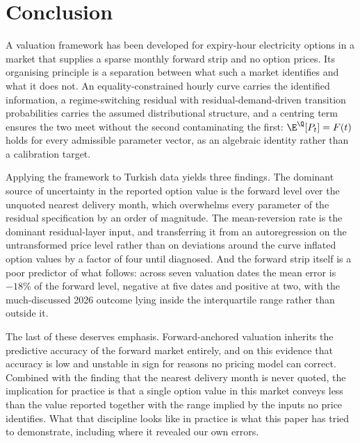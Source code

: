 \section{Conclusion}
\label{sec:conclusion}

A valuation framework has been developed for expiry-hour electricity options in a
market that supplies a sparse monthly forward strip and no option prices. Its
organising principle is a separation between what such a market identifies and
what it does not. An equality-constrained hourly curve carries the identified
information, a regime-switching residual with residual-demand-driven transition
probabilities carries the assumed distributional structure, and a centring term
ensures the two meet without the second contaminating the first:
$\E^{\Q}[P_t]=F(t)$ holds for every admissible parameter vector, as an algebraic
identity rather than a calibration target.

Applying the framework to Turkish data yields three findings. The dominant source
of uncertainty in the reported option value is the forward level over the
unquoted nearest delivery month, which overwhelms every parameter of the residual
specification by an order of magnitude. The mean-reversion rate is the dominant
residual-layer input, and transferring it from an autoregression on the
untransformed price level rather than on deviations around the curve inflated
option values by a factor of four until diagnosed. And the forward strip itself is a poor predictor of what follows: across seven
valuation dates the mean error is $-18\%$ of the forward level, negative at five
dates and positive at two, with the much-discussed 2026 outcome lying inside the
interquartile range rather than outside it.

The last of these deserves emphasis. Forward-anchored valuation inherits the
predictive accuracy of the forward market entirely, and on this evidence that
accuracy is low and unstable in sign for reasons no pricing model can correct.
Combined with the finding that the nearest delivery month is never quoted, the
implication for practice is that a single option value in this market conveys
less than the value reported together with the range implied by the inputs no
price identifies. What that discipline looks like in practice is what this paper
has tried to demonstrate, including where it revealed our own errors.
